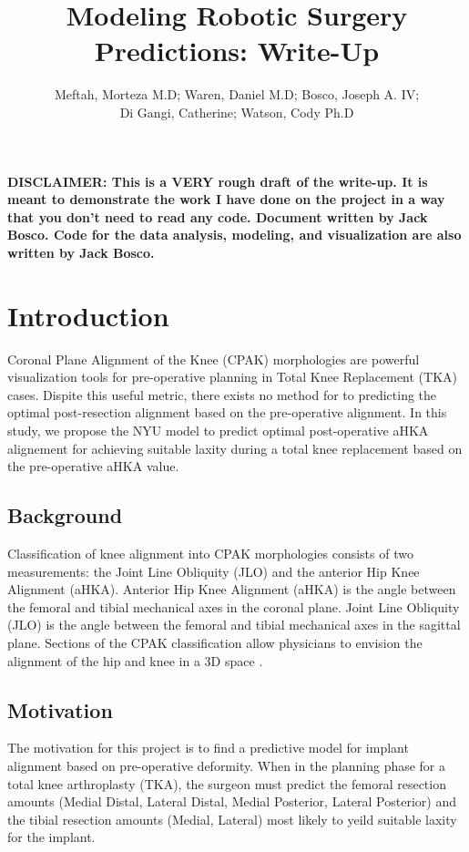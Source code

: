 \documentclass{article}
\author{Meftah, Morteza M.D; Waren, Daniel M.D; Bosco, Joseph A. IV;\\
Di Gangi, Catherine; Watson, Cody Ph.D}
\title{Modeling Robotic Surgery Predictions: Write-Up}
\begin{document}
\maketitle

\textbf{%
DISCLAIMER:
This is a VERY rough draft of the write-up. 
It is meant to demonstrate the work I have done on the project in a way that you don't need to read any code.
Document written by Jack Bosco. 
Code for the data analysis, modeling, and visualization are also written by Jack Bosco. 
}

\section{Introduction}

Coronal Plane Alignment of the Knee (CPAK) morphologies are powerful visualization tools for pre-operative planning in Total Knee Replacement (TKA) cases. \cite{MacDessi2021-mi}
Dispite this useful metric, there exists no method for to predicting the optimal post-resection alignment based on the pre-operative alignment.
In this study, we propose the NYU model to predict optimal post-operative aHKA alignement 
for achieving suitable laxity during a total knee replacement based on the pre-operative aHKA value.

\subsection{Background}

Classification of knee alignment into CPAK morphologies consists of two measurements: the Joint Line Obliquity (JLO) and the anterior Hip Knee Alignment (aHKA).
Anterior Hip Knee Alignment (aHKA) is the angle between the femoral and tibial mechanical axes in the coronal plane.
Joint Line Obliquity (JLO) is the angle between the femoral and tibial mechanical axes in the sagittal plane.
Sections of the CPAK classification allow physicians to envision the alignment of the hip and knee in a 3D space \cite{MacDessi2021-mi}.

\subsection{Motivation} %

The motivation for this project is to find a predictive model for implant alignment based on pre-operative deformity.
When in the planning phase for a total knee arthroplasty (TKA), the surgeon must predict the femoral resection amounts 
(Medial Distal, Lateral Distal, Medial Posterior, Lateral Posterior)
and the tibial resection amounts 
(Medial, Lateral)
most likely to yeild suitable laxity for the implant.
\end{document}
